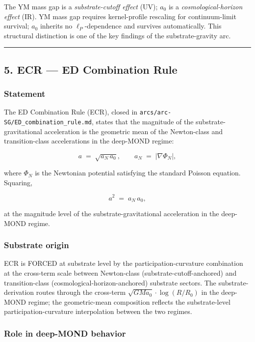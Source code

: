 \documentclass[
]{article}
\begin{document}
The YM mass gap is a \emph{substrate-cutoff effect} (UV); \(a_0\) is a
\emph{cosmological-horizon effect} (IR). YM mass gap requires
kernel-profile rescaling for continuum-limit survival; \(a_0\) inherits
no \(\ell_P\)-dependence and survives automatically. This structural
distinction is one of the key findings of the substrate-gravity arc.

\begin{center}\rule{0.5\linewidth}{0.5pt}\end{center}

\subsection{5. ECR --- ED Combination
Rule}\label{ecr-ed-combination-rule}

\subsubsection{Statement}\label{statement}

The ED Combination Rule (ECR), closed in
\texttt{arcs/arc-SG/ED\_combination\_rule.md}, states that the magnitude
of the substrate-gravitational acceleration is the geometric mean of the
Newton-class and transition-class accelerations in the deep-MOND regime:

\[a \;=\; \sqrt{a_N\,a_0}, \qquad a_N \;=\; |\nabla\Phi_N|,\]

where \(\Phi_N\) is the Newtonian potential satisfying the standard
Poisson equation. Squaring,

\[a^2 \;=\; a_N\,a_0,\]

at the magnitude level of the substrate-gravitational acceleration in
the deep-MOND regime.

\subsubsection{Substrate origin}\label{substrate-origin}

ECR is FORCED at substrate level by the participation-curvature
combination at the cross-term scale between Newton-class
(substrate-cutoff-anchored) and transition-class
(cosmological-horizon-anchored) substrate sectors. The
substrate-derivation routes through the cross-term
\(\sqrt{GMa_0}\cdot\log(R/R_0)\) in the deep-MOND regime; the
geometric-mean composition reflects the substrate-level
participation-curvature interpolation between the two regimes.

\subsubsection{Role in deep-MOND
behavior}\label{role-in-deep-mond-behavior}
\end{document}
